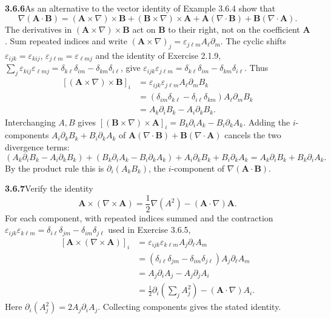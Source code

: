 \par\bigskip
\noindent\textbf{3.6.6}\quad As an alternative to the vector identity of
Example 3.6.4 show that
\[
\nabla(\mathbf{A}\cdot\mathbf{B})
=(\mathbf{A}\times\nabla)\times\mathbf{B}
+(\mathbf{B}\times\nabla)\times\mathbf{A}
+\mathbf{A}(\nabla\cdot\mathbf{B})+\mathbf{B}(\nabla\cdot\mathbf{A}).
\]
\solution
The derivatives in $(\mathbf A\times\nabla)\times\mathbf B$
act on $\mathbf B$ to their right, not on the coefficient $\mathbf A$.
Sum repeated indices and write
$(\mathbf A\times\nabla)_j=\varepsilon_{j\ell m}A_\ell\partial_m$. The
cyclic shifts $\varepsilon_{ijk}=\varepsilon_{kij}$,
$\varepsilon_{j\ell m}=\varepsilon_{\ell mj}$ and the identity of
Exercise 2.1.9, $\sum_j\varepsilon_{kij}\varepsilon_{\ell mj}
=\delta_{k\ell}\delta_{im}-\delta_{km}\delta_{i\ell}$, give
$\varepsilon_{ijk}\varepsilon_{j\ell m}
=\delta_{k\ell}\delta_{im}-\delta_{km}\delta_{i\ell}$.
Thus
\[
\begin{aligned}
{}[(\mathbf A\times\nabla)\times\mathbf B]_i
&=\varepsilon_{ijk}\varepsilon_{j\ell m}A_\ell\partial_mB_k\\
&=(\delta_{im}\delta_{k\ell}-\delta_{i\ell}\delta_{km})
A_\ell\partial_mB_k\\
&=A_k\partial_iB_k-A_i\partial_kB_k.
\end{aligned}
\]
Interchanging $A,B$ gives
$[(\mathbf B\times\nabla)\times\mathbf A]_i
=B_k\partial_iA_k-B_i\partial_kA_k$.
Adding the $i$-components $A_i\partial_kB_k+B_i\partial_kA_k$ of
$\mathbf A(\nabla\cdot\mathbf B)+\mathbf B(\nabla\cdot\mathbf A)$
cancels the two divergence terms:
\[
(A_k\partial_iB_k-A_i\partial_kB_k)+(B_k\partial_iA_k-B_i\partial_kA_k)
+A_i\partial_kB_k+B_i\partial_kA_k
=A_k\partial_iB_k+B_k\partial_iA_k.
\]
By the product rule this is $\partial_i(A_kB_k)$,
the $i$-component of $\nabla(\mathbf A\cdot\mathbf B)$.

\par\bigskip
\noindent\textbf{3.6.7}\quad Verify the identity
\[
\mathbf{A}\times(\nabla\times\mathbf{A})
=\frac{1}{2}\nabla(A^{2})-(\mathbf{A}\cdot\nabla)\mathbf{A}.
\]
\solution
For each component, with repeated indices summed and the contraction
$\varepsilon_{ijk}\varepsilon_{k\ell m}
=\delta_{i\ell}\delta_{jm}-\delta_{im}\delta_{j\ell}$ used in
Exercise 3.6.5,
\[
\begin{aligned}
{}[\mathbf A\times(\nabla\times\mathbf A)]_i
&=\varepsilon_{ijk}\varepsilon_{k\ell m}A_j\partial_\ell A_m\\
&=(\delta_{i\ell}\delta_{jm}-\delta_{im}\delta_{j\ell})
A_j\partial_\ell A_m\\
&=A_j\partial_iA_j-A_j\partial_jA_i\\
&=\tfrac12\partial_i\left(\sum_jA_j^2\right)
-(\mathbf A\cdot\nabla)A_i.
\end{aligned}
\]
Here $\partial_i(A_j^2)=2A_j\partial_iA_j$.
Collecting components gives the stated identity.

